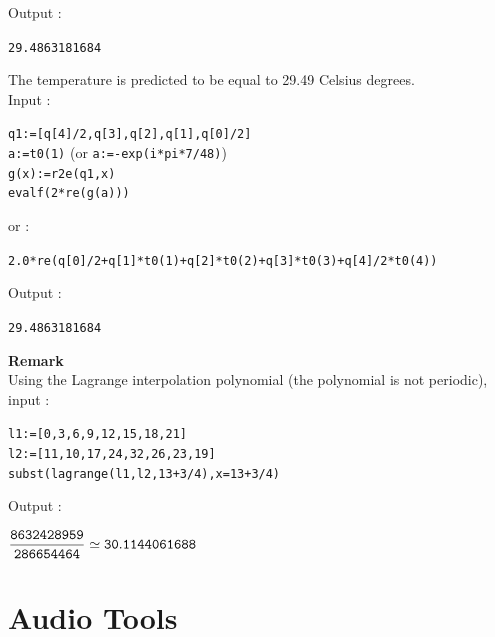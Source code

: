 \documentclass[a4paper,11pt]{book}
\begin{document}
Output :
\begin{center}
{\tt 29.4863181684}
\end{center}
The temperature is predicted to be equal to 29.49 Celsius degrees.\\
Input :
\begin{center}
{\tt q1:=[q[4]/2,q[3],q[2],q[1],q[0]/2]}\\
{\tt a:=t0(1)} (or {\tt a:=-exp(i*pi*7/48)})\\
{\tt g(x):=r2e(q1,x)}\\
{\tt evalf(2*re(g(a)))}
\end{center}
or :
\begin{center}
{\tt 2.0*re(q[0]/2+q[1]*t0(1)+q[2]*t0(2)+q[3]*t0(3)+q[4]/2*t0(4))}
\end{center}
Output :
\begin{center}
{\tt 29.4863181684}
\end{center}

{\bf Remark}\\
Using the Lagrange interpolation polynomial (the polynomial is not periodic),
input :
\begin{center}
{\tt l1:=[0,3,6,9,12,15,18,21]}\\
{\tt l2:=[11,10,17,24,32,26,23,19]}\\
{\tt subst(lagrange(l1,l2,13+3/4),x=13+3/4)}\\
\end{center}
Output :
\begin{center}
${\tt \displaystyle \frac{8632428959}{286654464}\simeq 30.1144061688}$
\end{center}

\section{Audio Tools}
\end{document}
